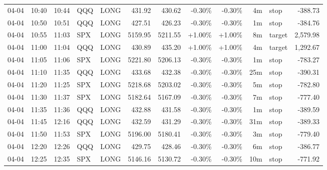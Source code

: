 \documentclass[11pt,a4paper,twoside]{article}
\begin{document}
\begin{center}
\begin{longtable}{>{\color{txtmain}}l l l l l r r r r r >{\color{txtmain}}l r}
04-04 & 10:40 & 10:44 & QQQ & LONG & 431.92 & 430.62 & \textcolor{lossred}{-0.30\%} & \textcolor{lossred}{-0.30\%} & 4m & stop & \textcolor{lossred}{-388.73} \\
04-04 & 10:50 & 10:51 & QQQ & LONG & 427.51 & 426.23 & \textcolor{lossred}{-0.30\%} & \textcolor{lossred}{-0.30\%} & 1m & stop & \textcolor{lossred}{-384.76} \\
04-04 & 10:55 & 11:03 & SPX & LONG & 5159.95 & 5211.55 & \textcolor{wingreen}{+1.00\%} & \textcolor{wingreen}{+1.00\%} & 8m & target & \textcolor{wingreen}{2,579.98} \\
04-04 & 11:00 & 11:04 & QQQ & LONG & 430.89 & 435.20 & \textcolor{wingreen}{+1.00\%} & \textcolor{wingreen}{+1.00\%} & 4m & target & \textcolor{wingreen}{1,292.67} \\
04-04 & 11:05 & 11:06 & SPX & LONG & 5221.80 & 5206.13 & \textcolor{lossred}{-0.30\%} & \textcolor{lossred}{-0.30\%} & 1m & stop & \textcolor{lossred}{-783.27} \\
04-04 & 11:10 & 11:35 & QQQ & LONG & 433.68 & 432.38 & \textcolor{lossred}{-0.30\%} & \textcolor{lossred}{-0.30\%} & 25m & stop & \textcolor{lossred}{-390.31} \\
04-04 & 11:20 & 11:25 & SPX & LONG & 5218.68 & 5203.02 & \textcolor{lossred}{-0.30\%} & \textcolor{lossred}{-0.30\%} & 5m & stop & \textcolor{lossred}{-782.80} \\
04-04 & 11:30 & 11:37 & SPX & LONG & 5182.64 & 5167.09 & \textcolor{lossred}{-0.30\%} & \textcolor{lossred}{-0.30\%} & 7m & stop & \textcolor{lossred}{-777.40} \\
04-04 & 11:35 & 11:36 & QQQ & LONG & 432.88 & 431.58 & \textcolor{lossred}{-0.30\%} & \textcolor{lossred}{-0.30\%} & 1m & stop & \textcolor{lossred}{-389.59} \\
04-04 & 11:45 & 12:16 & QQQ & LONG & 432.59 & 431.29 & \textcolor{lossred}{-0.30\%} & \textcolor{lossred}{-0.30\%} & 31m & stop & \textcolor{lossred}{-389.33} \\
04-04 & 11:50 & 11:53 & SPX & LONG & 5196.00 & 5180.41 & \textcolor{lossred}{-0.30\%} & \textcolor{lossred}{-0.30\%} & 3m & stop & \textcolor{lossred}{-779.40} \\
04-04 & 12:20 & 12:26 & QQQ & LONG & 429.75 & 428.46 & \textcolor{lossred}{-0.30\%} & \textcolor{lossred}{-0.30\%} & 6m & stop & \textcolor{lossred}{-386.77} \\
04-04 & 12:25 & 12:35 & SPX & LONG & 5146.16 & 5130.72 & \textcolor{lossred}{-0.30\%} & \textcolor{lossred}{-0.30\%} & 10m & stop & \textcolor{lossred}{-771.92} \\

\end{longtable}
\end{center}
\end{document}
